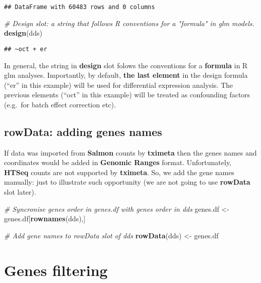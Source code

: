 \documentclass[]{book}
\newenvironment{Shaded}{\begin{snugshade}}{\end{snugshade}}
\newcommand{\KeywordTok}[1]{\textcolor[rgb]{0.13,0.29,0.53}{\textbf{#1}}}
\newcommand{\StringTok}[1]{\textcolor[rgb]{0.31,0.60,0.02}{#1}}
\newcommand{\CommentTok}[1]{\textcolor[rgb]{0.56,0.35,0.01}{\textit{#1}}}
\newcommand{\NormalTok}[1]{#1}
\begin{document}
\begin{verbatim}
## DataFrame with 60483 rows and 0 columns
\end{verbatim}

\begin{Shaded}
\begin{Highlighting}[]
\CommentTok{# Design slot: a string that follows R conventions for a "formula" in glm models.    }
\KeywordTok{design}\NormalTok{(dds)}
\end{Highlighting}
\end{Shaded}

\begin{verbatim}
## ~oct + er
\end{verbatim}

In general, the string in \textbf{design} slot folows the conventions
for a \textbf{formula} in R glm analyses. Importantly, by default,
\textbf{the last element} in the design formula (``er'' in this example)
will be used for differential expression analysis. The previous elements
(``oct'' in this example) will be treated as confounding factors
(e.g.~for batch effect correction etc).

\subsection{rowData: adding genes
names}\label{rowdata-adding-genes-names}

If data was imported from \textbf{Salmon} counts by \textbf{tximeta}
then the genes names and coordinates would be added in \textbf{Genomic
Ranges} format. Unfortunately, \textbf{HTSeq} counts are not supported
by \textbf{tximeta}. So, we add the gene names manually: just to
illustrate such opportunity (we are not going to use \textbf{rowData}
slot later).

\begin{Shaded}
\begin{Highlighting}[]
\CommentTok{# Syncronise genes order in genes.df with genes order in dds}
\NormalTok{genes.df <-}\StringTok{ }\NormalTok{genes.df[}\KeywordTok{rownames}\NormalTok{(dds),]}

\CommentTok{# Add gene names to rowData slot of dds}
\KeywordTok{rowData}\NormalTok{(dds) <-}\StringTok{ }\NormalTok{genes.df}
\end{Highlighting}
\end{Shaded}

\section{Genes filtering}\label{genes-filtering}
\end{document}
